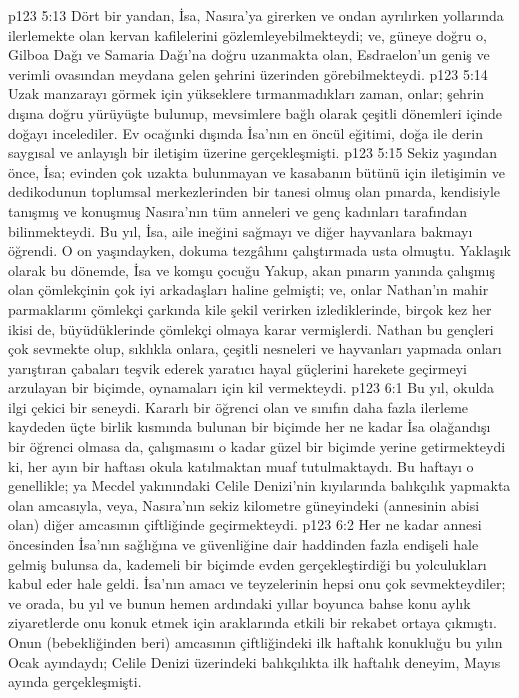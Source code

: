 \vs p123 5:13 Dört bir yandan, İsa, Nasıra’ya girerken ve ondan ayrılırken yollarında ilerlemekte olan kervan kafilelerini gözlemleyebilmekteydi; ve, güneye doğru o, Gilboa Dağı ve Samaria Dağı’na doğru uzanmakta olan, Esdraelon’un geniş ve verimli ovasından meydana gelen şehrini üzerinden görebilmekteydi.
\vs p123 5:14 Uzak manzarayı görmek için yükseklere tırmanmadıkları zaman, onlar; şehrin dışına doğru yürüyüşte bulunup, mevsimlere bağlı olarak çeşitli dönemleri içinde doğayı incelediler. Ev ocağınki dışında İsa’nın en öncül eğitimi, doğa ile derin saygısal ve anlayışlı bir iletişim üzerine gerçekleşmişti.
\vs p123 5:15 Sekiz yaşından önce, İsa; evinden çok uzakta bulunmayan ve kasabanın bütünü için iletişimin ve dedikodunun toplumsal merkezlerinden bir tanesi olmuş olan pınarda, kendisiyle tanışmış ve konuşmuş Nasıra’nın tüm anneleri ve genç kadınları tarafından bilinmekteydi. Bu yıl, İsa, aile ineğini sağmayı ve diğer hayvanlara bakmayı öğrendi. O on yaşındayken, dokuma tezgâhını çalıştırmada usta olmuştu. Yaklaşık olarak bu dönemde, İsa ve komşu çocuğu Yakup, akan pınarın yanında çalışmış olan çömlekçinin çok iyi arkadaşları haline gelmişti; ve, onlar Nathan’ın mahir parmaklarını çömlekçi çarkında kile şekil verirken izlediklerinde, birçok kez her ikisi de, büyüdüklerinde çömlekçi olmaya karar vermişlerdi. Nathan bu gençleri çok sevmekte olup, sıklıkla onlara, çeşitli nesneleri ve hayvanları yapmada onları yarıştıran çabaları teşvik ederek yaratıcı hayal güçlerini harekete geçirmeyi arzulayan bir biçimde, oynamaları için kil vermekteydi.
\vs p123 6:1 Bu yıl, okulda ilgi çekici bir seneydi. Kararlı bir öğrenci olan ve sınıfın daha fazla ilerleme kaydeden üçte birlik kısmında bulunan bir biçimde her ne kadar İsa olağandışı bir öğrenci olmasa da, çalışmasını o kadar güzel bir biçimde yerine getirmekteydi ki, her ayın bir haftası okula katılmaktan muaf tutulmaktaydı. Bu haftayı o genellikle; ya Mecdel yakınındaki Celile Denizi’nin kıyılarında balıkçılık yapmakta olan amcasıyla, veya, Nasıra’nın sekiz kilometre güneyindeki (annesinin abisi olan) diğer amcasının çiftliğinde geçirmekteydi.
\vs p123 6:2 Her ne kadar annesi öncesinden İsa’nın sağlığına ve güvenliğine dair haddinden fazla endişeli hale gelmiş bulunsa da, kademeli bir biçimde evden gerçekleştirdiği bu yolculukları kabul eder hale geldi. İsa’nın amacı ve teyzelerinin hepsi onu çok sevmekteydiler; ve orada, bu yıl ve bunun hemen ardındaki yıllar boyunca bahse konu aylık ziyaretlerde onu konuk etmek için araklarında etkili bir rekabet ortaya çıkmıştı. Onun (bebekliğinden beri) amcasının çiftliğindeki ilk haftalık konukluğu bu yılın Ocak ayındaydı; Celile Denizi üzerindeki balıkçılıkta ilk haftalık deneyim, Mayıs ayında gerçekleşmişti.
